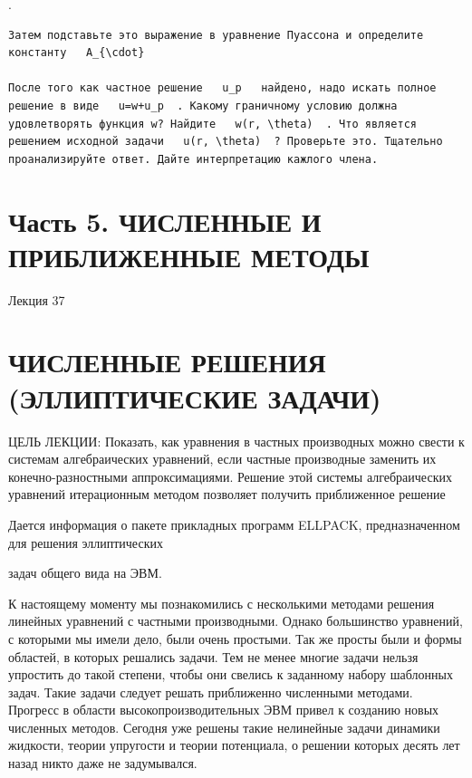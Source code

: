 \documentclass[
  ukrainian,
]{article}
\begin{document}
.

\begin{verbatim}
Затем подставьте это выражение в уравнение Пуассона и определите константу   A_{\cdot}

После того как частное решение   u_p   найдено, надо искать полное решение в виде   u=w+u_p  . Какому граничному условию должна удовлетворять функция w? Найдите   w(r, \theta)  . Что является решением исходной задачи   u(r, \theta)  ? Проверьте это. Тщательно проанализируйте ответ. Дайте интерпретацию кажлого члена.
\end{verbatim}

\section{Часть 5. ЧИСЛЕННЫЕ И ПРИБЛИЖЕННЫЕ
МЕТОДЫ}\label{ux447ux430ux441ux442ux44c-5.-ux447ux438ux441ux43bux435ux43dux43dux44bux435-ux438-ux43fux440ux438ux431ux43bux438ux436ux435ux43dux43dux44bux435-ux43cux435ux442ux43eux434ux44b}

Лекция 37

\section{ЧИСЛЕННЫЕ РЕШЕНИЯ (ЭЛЛИПТИЧЕСКИЕ
ЗАДАЧИ)}\label{ux447ux438ux441ux43bux435ux43dux43dux44bux435-ux440ux435ux448ux435ux43dux438ux44f-ux44dux43bux43bux438ux43fux442ux438ux447ux435ux441ux43aux438ux435-ux437ux430ux434ux430ux447ux438}

ЦЕЛЬ ЛЕКЦИИ: Показать, как уравнения в частных производных можно свести
к системам алгебраических уравнений, если частные производные заменить
их конечно-разностными аппроксимациями. Решение этой системы
алгебраических уравнений итерационным методом позволяет получить
приближенное решение

Дается информация о пакете прикладных программ ELLPACK, предназначенном
для решения эллиптических

задач общего вида на ЭВМ.

К настоящему моменту мы познакомились с несколькими методами решения
линейных уравнений с частными производными. Однако большинство
уравнений, с которыми мы имели дело, были очень простыми. Так же просты
были и формы областей, в которых решались задачи. Тем не менее многие
задачи нельзя упростить до такой степени, чтобы они свелись к заданному
набору шаблонных задач. Такие задачи следует решать приближенно
численными методами. Прогресс в области высокопроизводительных ЭВМ
привел к созданию новых численных методов. Сегодня уже решены такие
нелинейные задачи динамики жидкости, теории упругости и теории
потенциала, о решении которых десять лет назад никто даже не
задумывался.
\end{document}
